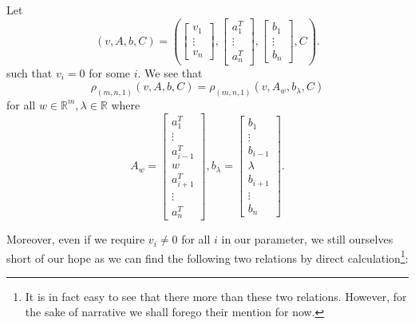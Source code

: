 \documentclass[11pt,letterpaper]{amsart}
\begin{document}
\begin{lemma}\label{lem:weakcounterexample}
    Let 
    $$
    (v, A, b, C) = \left(\begin{bmatrix}
        v_1 \\ \vdots \\ v_n
    \end{bmatrix}, \begin{bmatrix}
        a_1^T \\ \vdots \\ a_n^T
    \end{bmatrix}, \begin{bmatrix}
        b_1 \\ \vdots \\ b_n
    \end{bmatrix}, C\right).
    $$
    such that $v_i=0$ for some $i$. We see that 
    $$
    \rho_{(m,n,1)}(v, A, b, C) = \rho_{(m,n,1)}(v, A_{w}, b_\lambda, C)
    $$
    for all $w\in\mathbb{R}^m, \lambda\in \mathbb{R}$ where 
    $$
    A_w = \begin{bmatrix}
        a_1^T \\ \vdots  \\ a_{i-1}^T \\ w \\ a_{i+1}^T\\ \vdots \\ a_n^T
    \end{bmatrix}, b_\lambda = \begin{bmatrix}
        b_1 \\ \vdots  \\ b_{i-1} \\ \lambda \\ b_{i+1}\\ \vdots \\ b_n
    \end{bmatrix}.
    $$
\end{lemma}
Moreover, even if we require $v_i\neq 0$ for all $i$ in our parameter, we still ourselves short of our hope as we can find the following two relations by direct calculation\footnote{It is in fact easy to see that there more than these two relations. However, for the sake of narrative we shall forego their mention for now.}:
\end{document}
